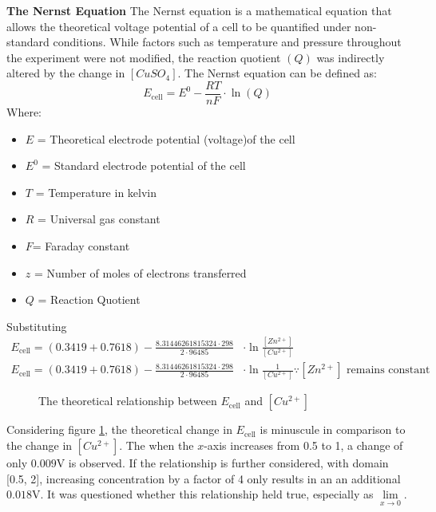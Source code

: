 \documentclass[11pt,a4paper]{article}
\begin{document}
	

	\textbf{The Nernst Equation}\newline
	The Nernst equation is a mathematical equation that allows the theoretical voltage potential of a cell to be quantified under non-standard conditions. While factors such as temperature and pressure throughout the experiment were not modified, the reaction quotient $(Q)$ was indirectly altered by the change in $[CuSO_4]$. 
\newline The Nernst equation can be defined as:
	$$
	E_{\textrm{cell}}=E^0 - \frac{RT}{nF}\cdot \ln(Q)
	$$
	Where:
	\begin{itemize}
		\item $E$ = Theoretical electrode potential (voltage)of the cell
		\item $E^0$ = Standard electrode potential of the cell
		\item $T$ = Temperature in kelvin 
		\item $R$ = Universal gas constant
		\item $F$= Faraday constant
		\item $z$ = Number of moles of electrons transferred
		\item $Q$ = Reaction Quotient
		

	\end{itemize}
Substituting 
\begin{align*}
E_{\textrm{cell}}=(0.3419+0.7618)-\frac{8.31446261815324\cdot298}{2\cdot96485}&\cdot\ln\frac{[Zn^{2+}]}{[Cu^{2+}]}\\
E_{\textrm{cell}}=(0.3419+0.7618)-\frac{8.31446261815324\cdot298}{2\cdot96485}&\cdot\ln\frac{1}{[Cu^{2+}]} \because [Zn^{2+}]\textrm{ remains constant}
\end{align*}

\begin{figure}

	\centering

 
		\caption{The theoretical relationship between $E_{\textrm{cell}}$ and $[Cu^{2+}]$}
		\label{ogLog}
\end{figure}
\newpage
Considering figure \ref{ogLog}, the theoretical change in $E_\textrm{cell}$ is minuscule in comparison to the change in $[Cu^{2+}]$. The when the $x$-axis increases from 0.5 to 1, a change of only $0.009$V is observed. If the relationship is further considered, with domain [0.5, 2], increasing concentration by a factor of 4 only results in an an additional $0.018$V. It was questioned whether this relationship held true, especially as $\lim\limits_{x\to 0}$.
\end{document}
